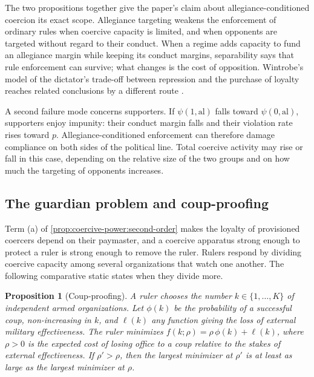 \documentclass[11pt,letterpaper]{article}
\newtheorem{proposition}[theorem]{Proposition}
\theoremstyle{definition}
\theoremstyle{remark}
\begin{document}
The two propositions together give the paper's claim about allegiance-conditioned coercion its exact scope. Allegiance targeting weakens the enforcement of ordinary rules when coercive capacity is limited, and when opponents are targeted without regard to their conduct. When a regime adds capacity to fund an allegiance margin while keeping its conduct margins, separability says that rule enforcement can survive; what changes is the cost of opposition. Wintrobe's model of the dictator's trade-off between repression and the purchase of loyalty reaches related conclusions by a different route \citep{wintrobe1998}.

A second failure mode concerns supporters. If $\psi(1,\mathrm{al})$ falls toward $\psi(0,\mathrm{al})$, supporters enjoy impunity: their conduct margin falls and their violation rate rises toward $p$. Allegiance-conditioned enforcement can therefore damage compliance on both sides of the political line. Total coercive activity may rise or fall in this case, depending on the relative size of the two groups and on how much the targeting of opponents increases.

\subsection{The guardian problem and coup-proofing}

Term (a) of \cref{prop:coercive-power:second-order} makes the loyalty of provisioned coercers depend on their paymaster, and a coercive apparatus strong enough to protect a ruler is strong enough to remove the ruler. Rulers respond by dividing coercive capacity among several organizations that watch one another. The following comparative static states when they divide more.

\begin{proposition}[Coup-proofing]
\label{prop:coercive-power:coup-proofing}
A ruler chooses the number $k \in \{1, \dots, K\}$ of independent armed organizations. Let $\phi(k)$ be the probability of a successful coup, non-increasing in $k$, and $\ell(k)$ any function giving the loss of external military effectiveness. The ruler minimizes $f(k; \rho) = \rho\, \phi(k) + \ell(k)$, where $\rho > 0$ is the expected cost of losing office to a coup relative to the stakes of external effectiveness. If $\rho' > \rho$, then the largest minimizer at $\rho'$ is at least as large as the largest minimizer at $\rho$.
\end{proposition}
\end{document}
